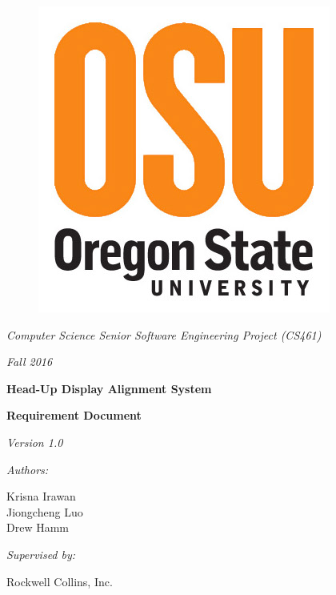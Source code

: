\documentclass[letterpaper,10pt,onecolumn]{IEEEtran}
\def\name{Krisna Irawan\\ Jiongcheng Luo\\ Drew Hamm}
\def\doc{Requirement Document}
\def\version{Version 1.0}
\begin{document}
\begin{titlepage}
	\centering
	\begin{figure}
		\centering
	      	\includegraphics[scale=0.3]{osu_logo}
	\end{figure}
	{\Large\itshape Computer Science Senior Software Engineering Project (CS461)\par}
	{\Large\itshape Fall 2016\par}
	\vspace{1cm}
	{\huge\bfseries Head-Up Display Alignment System\par}
	\vspace{5mm}
	{\huge\bfseries \doc\par}
	\vspace{5mm}
	{\large\itshape \version\par}
	\vspace{1cm}
	{\large\itshape Authors:\par}
	{\large \name\par}
	\vspace{1cm}
	{\large\itshape Supervised by:\par}
	{\large Rockwell Collins, Inc.\par}
	\vspace{3cm}

	\begin{abstract}
	We are working with Rockwell Collins to explore potential technological innovations relating to their Head-Up Display (HUD) systems that present critical flight information to pilots. Our primary objective is to improve Rockwell Collins current HUD systems by reducing the cost and time required to precisely align flight information to the HUD. To meet our objective we will look into using a new alignment methodology in conjunction with the current HUD system as a proof of concept. The product being developed is a demonstration system that looks to include a MEMS IRU mounted onto the HUD and a new alignment algorithm that utilizes this additional sensor to determine accurate HUD alignment. This document will introduce the specific details of the demonstration system and describe the requirements for the development of the product.
	\end{abstract}
\end{titlepage}
\tableofcontents
\end{document}
